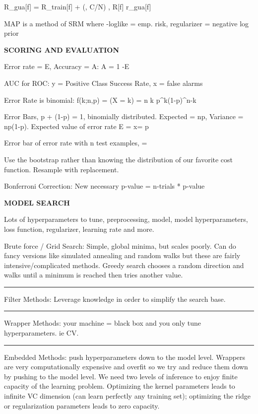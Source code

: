 \documentclass[a4paper,twoside,twocolumn]{article}
\begin{document}
{{R_{gua}[f] = R_{train}[f] + \ep(\delta, C/N) , R[f] \leq r_{gua}[f]

MAP is a method of SRM where -loglike = emp. risk, regularizer = negative log prior
}

\textbf{SCORING AND EVALUATION}

\setlength{\parindent}{0pt}
{\scriptsize
Error rate = E, Accuracy = A: A = 1 -E

AUC for ROC: y = Positive Class Success Rate, x = false alarms

Error Rate is binomial:  f(k;n,p) = \Pr(X = k) = \binom n k  p^k(1-p)^{n-k}

Error Bars, p + (1-p) = 1, binomially distributed. Expected = np, Variance = np(1-p). Expected value of error rate E = x\n = p

Error bar of error rate with n test examples, \sigma = 

Use the bootstrap rather than knowing the distribution of our favorite cost function. Resample with replacement.

Bonferroni Correction: New necessary p-value = n-trials * p-value

}

\textbf{MODEL SEARCH}

\setlength{\parindent}{0pt}
{\scriptsize
Lots of hyperparameters to tune, preprocessing, model, model hyperparameters, loss function, regularizer, learning rate and more.

Brute force / Grid Search: Simple, global minima, but scales poorly. Can do fancy versions like simulated annealing and random walks but these are fairly intensive/complicated methods. Greedy search chooses a random direction and walks until a minimum is reached then tries another value.

\noindent\rule{8cm}{0.4pt}

Filter Methods: Leverage knowledge in order to simplify the search base.

\noindent\rule{8cm}{0.4pt}

Wrapper Methods: your machine = black box and you only tune hyperparameters. ie CV.

\noindent\rule{8cm}{0.4pt}

Embedded Methods: push hyperparameters down to the model level. Wrappers are very computationally expensive and overfit so we try and reduce them down by pushing to the model level. We need two levels of inference to enjoy finite capacity of the learning problem. Optimizing the kernel parameters leads to infinite VC dimension (can learn perfectly any training set); optimizing the ridge or regularization parameters leads to zero capacity.

}}
\end{document}
